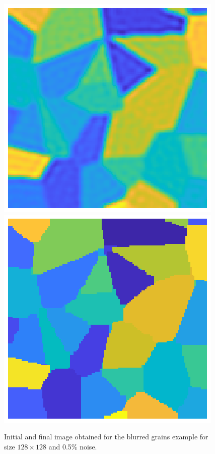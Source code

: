 \begin{figure}[htbp]
\begin{center}
\includegraphics{figures/blurring_initial}\includegraphics{figures/blurring_final}
\caption{Initial and final image obtained for the blurred grains example for size $128 \times 128$ and 0.5\% noise.}
\label{fig:grains_blurring_initial_and_final}
\end{center}
\end{figure}

